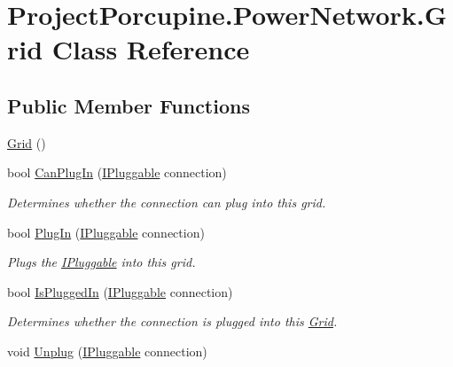 \hypertarget{class_project_porcupine_1_1_power_network_1_1_grid}{}\section{Project\+Porcupine.\+Power\+Network.\+Grid Class Reference}
\label{class_project_porcupine_1_1_power_network_1_1_grid}
\subsection*{Public Member Functions}
\begin{DoxyCompactItemize}
\item 
\hyperlink{class_project_porcupine_1_1_power_network_1_1_grid_a9a6675ff50fe5939bc19ebdf49e4aa87}{Grid} ()
\item 
bool \hyperlink{class_project_porcupine_1_1_power_network_1_1_grid_ad9f6231845db898ab5cefb659ba38572}{Can\+Plug\+In} (\hyperlink{interface_project_porcupine_1_1_power_network_1_1_i_pluggable}{I\+Pluggable} connection)
\begin{DoxyCompactList}\small\item\em Determines whether the connection can plug into this grid. \end{DoxyCompactList}\item 
bool \hyperlink{class_project_porcupine_1_1_power_network_1_1_grid_a4848e6cc4ac8aceb3e1ff92ff5a01179}{Plug\+In} (\hyperlink{interface_project_porcupine_1_1_power_network_1_1_i_pluggable}{I\+Pluggable} connection)
\begin{DoxyCompactList}\small\item\em Plugs the \hyperlink{interface_project_porcupine_1_1_power_network_1_1_i_pluggable}{I\+Pluggable} into this grid. \end{DoxyCompactList}\item 
bool \hyperlink{class_project_porcupine_1_1_power_network_1_1_grid_a738028256ea811fa43b7022798ca527c}{Is\+Plugged\+In} (\hyperlink{interface_project_porcupine_1_1_power_network_1_1_i_pluggable}{I\+Pluggable} connection)
\begin{DoxyCompactList}\small\item\em Determines whether the connection is plugged into this \hyperlink{class_project_porcupine_1_1_power_network_1_1_grid}{Grid}. \end{DoxyCompactList}\item 
void \hyperlink{class_project_porcupine_1_1_power_network_1_1_grid_aa1b238cb717ad56a98c32890a2759e74}{Unplug} (\hyperlink{interface_project_porcupine_1_1_power_network_1_1_i_pluggable}{I\+Pluggable} connection)

\end{DoxyCompactItemize}

